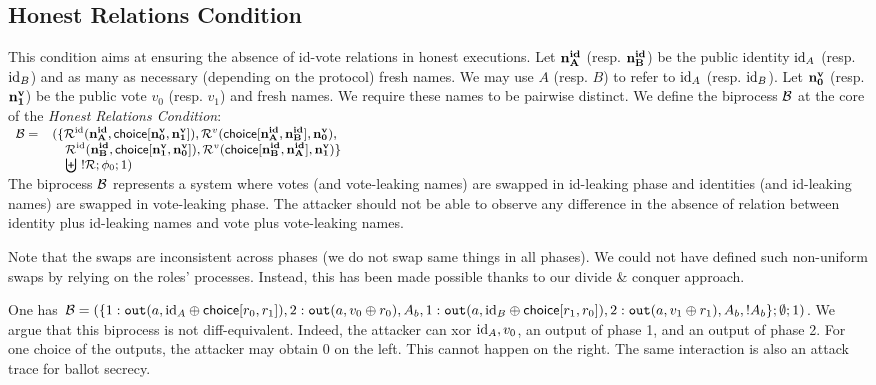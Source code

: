 


\subsection{Honest Relations Condition}
\label{sec:condi:honest}
This condition aims at ensuring the absence of id-vote relations in honest executions.
Let ${\mathbf{n^{id}_{A}}}$ (resp. ${\mathbf{n^{id}_{B}}}$) be the public identity $\mathrm{id}_A$ (resp. $\mathrm{id}_B$) and as many as necessary (depending on the protocol) fresh names.
We may use $A$ (resp. $B$) to refer to $\mathrm{id}_A$ (resp. $\mathrm{id}_B$).
Let ${\mathbf{n^{v}_{0}}}$ (resp. ${\mathbf{n^{v}_{1}}}$) be the public vote $v_0$ (resp. $v_1$)
and fresh names. We require these names to be pairwise distinct.
We define the biprocess $\mathcal{B}$ at the core of the
{\em Honest Relations Condition}:\\[1mm]
\null\hfill$
\begin{small}
  \begin{array}{rl}
    \biproc = 
    &(\{
      \roles^{\id}(\nID{A},\choice{\nV{0}}{\nV{1}}),
      \roles^v(\choice{\nID{A}}{\nID{B}},\nV{0}),\\
    &\  \ \ \roles^{\id}(\nID{B},\choice{\nV{1}}{\nV{0}}),
      \roles^v(\choice{\nID{B}}{\nID{A}},\nV{1}) \}\\
    &\ \ \ \biguplus\ !\roles; \phi_0;1)\\
  \end{array}
\end{small}
$\hfill\null\\[1mm]
The biprocess $\mathcal{B}$ represents a system where votes (and vote-leaking names)
are swapped in
id-leaking phase and identities (and id-leaking names)
are swapped in vote-leaking phase.
The attacker should not be able to observe any difference in the absence of
relation between identity plus id-leaking names and vote plus
vote-leaking names.

  Note that the swaps are inconsistent across phases
  (\ie we do not swap same things in all phases).
  We could not have defined such non-uniform swaps by relying on the roles'
  processes. Instead, this has been made possible thanks to our divide \& conquer approach.

\begin{example}
\label{ex:xorEx:honestRel}
  One has
$\biproc = (
\{
  \phase 1 \Out(a, \id_A\oplus\choice{r_0}{r_1}),
  \phase 2 \Out(a, v_0\oplus r_0), 
  A_b,\linebreak[4]
  \phase 1 \Out(a, \id_B\oplus \choice{r_1}{r_0}), 
  \phase 2 \Out(a, v_1\oplus r_1),
  A_b,
  !A_b
\};\emptyset;1)$.
We argue that this biprocess is not diff-equivalent. Indeed, 
the attacker can xor $\mathrm{id}_A,v_0$, an output of phase 1, and an output of phase 2. For one
choice of the outputs, the attacker may obtain $0$ on the left. This cannot happen on the right.
The same interaction is also an attack trace for ballot secrecy.
\end{example}


